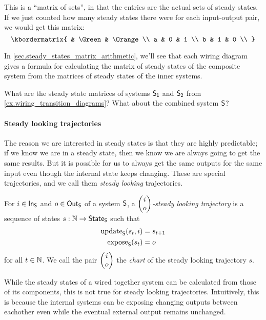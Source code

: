 \documentclass[DynamicalBook]{subfiles}
\begin{document}
{This is a ``matrix of sets'', in that the entries are the actual sets of steady
states. If we just counted how many steady states there were for each
input-output pair, we would get this matrix:
\begin{equation}\label{eqn.steady_state_matrix_transition_diagram_discrete2}
\kbordermatrix{
  & \Green & \Orange\\
  a & 0 & 1  \\
  b & 1 & 0  \\
}
\end{equation}

In \cref{sec.steady_states_matrix_arithmetic}, we'll see that each wiring
diagram gives a formula for calculating the matrix of steady states of the
composite system from the matrices of steady states of the inner systems. 

\begin{exercise}\label{ex.find_steady_states1}
  What are the steady state matrices of systems $\mathsf{S_1}$ and $\mathsf{S_2}$ from
  \cref{ex.wiring_transition_diagrams}? What about the combined system $\mathsf{S}$?
\end{exercise}

\paragraph{Steady looking trajectories}

The reason we are interested in steady states is that they are highly
predictable; if we know we are in a steady state, then we know we are always
going to get the same results. But it is possible for us to always get the same
outputs for the same input even though the internal state keeps changing. These
are special trajectories, and we call them \emph{steady looking} trajectories.

\begin{definition}\label{def.steady_looking_trajectory_discrete}
  For $i \in \mathsf{In}_{\mathsf{S}}$ and $o \in \mathsf{Out}_{\mathsf{S}}$ of a system $\mathsf{S}$, a \emph{$\begin{pmatrix}{i} \\ {o} \end{pmatrix}$-steady
    looking trajectory} is a sequence of states $s : \mathbb{N} \to \mathsf{State}_{\mathsf{S}}$ such
  that
  \begin{align*}
    \mathrm{update}_{\mathsf{S}}(s_t, i) &= s_{t + 1} \\
    \mathrm{expose}_{\mathsf{S}}(s_t) &= o
  \end{align*}
  for all $t \in \mathbb{N}$. We call the pair $\begin{pmatrix}{i} \\ {o} \end{pmatrix}$ the \emph{chart} of the
  steady looking trajectory $s$.
\end{definition}

While the steady states of a wired together system can be calculated from those
of its components, this is not true for steady looking trajectories.
Intuitively, this is because the internal systems can be exposing changing
outputs between eachother even while the eventual external output remains
unchanged.

}
\end{document}
